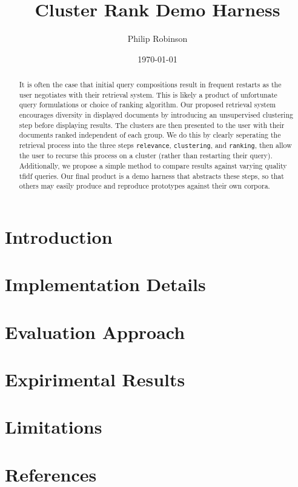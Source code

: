 \documentclass[12pt,twocolumn]{article} %
\title{Cluster Rank Demo Harness}
\date{\today}
\author{Philip Robinson}
\affil{Oregon Health Sciences University}
\begin{document}
\maketitle
{}
\begin{abstract}
  It is often the case that initial query compositions result in frequent restarts as
  the user negotiates with their retrieval system. This is likely a product of unfortunate
  query formulations or choice of ranking algorithm. Our proposed retrieval system
  encourages diversity in displayed documents by introducing an unsupervised clustering
  step before displaying results. The clusters are then presented to the user with their
  documents ranked independent of each group. We do this by clearly seperating the
  retrieval process into the three steps \texttt{relevance}, \texttt{clustering}, and
  \texttt{ranking}, then allow the user to recurse this process on a cluster (rather
  than restarting their query). Additionally, we propose a simple method to
  compare results against varying quality tfidf queries. Our final product is a demo
  harness that abstracts these steps, so that others may easily produce and reproduce
  prototypes against their own corpora.
\end{abstract}

\section{Introduction}
\section{Implementation Details}
\section{Evaluation Approach}
\section{Expirimental Results}
\section{Limitations}
\section{References}
\end{document}

